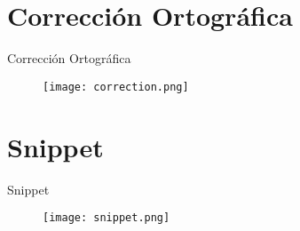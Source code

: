 \documentclass{beamer}
\begin{document}
\section{Corrección Ortográfica}

\begin{frame}{Corrección Ortográfica}
    \begin{figure}
        \texttt{[image: correction.png]}
    \end{figure}
\end{frame}


\section{Snippet}

\begin{frame}{Snippet}
    \begin{figure}
        \texttt{[image: snippet.png]}
    \end{figure}
\end{frame}
\end{document}
